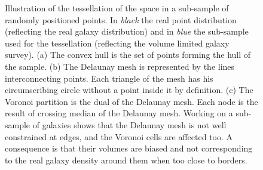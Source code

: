 \begin{figure}
\begin{minipage}{0.33\linewidth}
{    }
    \end{minipage}
    \begin{minipage}{0.33\linewidth}
    \centering
    \end{minipage}
    \caption{Illustration of the tessellation of the space in a sub-sample of
        randomly positioned points. In \emph{black} the real point distribution
        (reflecting the real galaxy distribution) and in \emph{blue} the
        sub-sample used for the tessellation (reflecting the volume limited
        galaxy survey). (a) The convex hull is the set of points forming the
        hull of the sample. (b) The Delaunay mesh is represented by the lines
        interconnecting points. Each triangle of the mesh has his
        circumscribing circle without a point inside it by definition. (c) The
        Voronoi partition is the dual of the Delaunay mesh. Each node is the
        result of crossing median of the Delaunay mesh. Working on a sub-sample
        of galaxies shows that the Delaunay mesh is not well constrained at
    edges, and the Voronoi cells are affected too. A consequence is that their
volumes are biased and not corresponding to the real galaxy density around
them when too close to borders.\label{fig:convex_delaunay_voronoi}}
\end{figure}

